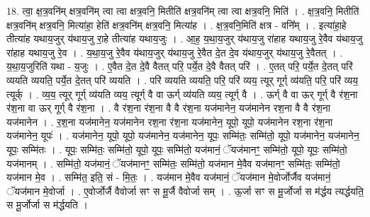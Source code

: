\documentclass[17pt]{extarticle}
\begin{document}
18. त्वा॒ क्ष॒त्र॒वनि॑म् क्षत्र॒वनि॑म् त्वा त्वा क्षत्र॒वनि॒ मितीति॑ क्षत्र॒वनि॑म् त्वा त्वा क्षत्र॒वनि॒ मिति॑ । . क्ष॒त्र॒वनि॒ मितीति॑ क्षत्र॒वनि॑म् क्षत्र॒वनि॒ मित्या॑हा॒ हेति॑ क्षत्र॒वनि॑म् क्षत्र॒वनि॒ मित्या॑ह । . क्ष॒त्र॒वनि॒मिति॑ क्षत्र - वनि᳚म् । . इत्या॑हा॒हे तीत्या॑ह यथाय॒जुर् य॑थाय॒जु रा॒हे तीत्या॑ह यथाय॒जुः । . आ॒ह॒ य॒था॒य॒जुर् य॑थाय॒जु रा॑हाह यथाय॒जु रे॒वैव य॑थाय॒जु रा॑हाह यथाय॒जु रे॒व । . य॒था॒य॒जु रे॒वैव य॑थाय॒जुर् य॑थाय॒जु रे॒वैत दे॒त दे॒व य॑थाय॒जुर् य॑थाय॒जु रे॒वैतत् । . य॒था॒य॒जुरिति॑ यथा - य॒जुः । . ए॒वैत दे॒त दे॒वै वैतत् परि॒ पर्ये॒त दे॒वै वैतत् परि॑ । . ए॒तत् परि॒ पर्ये॒त दे॒तत् परि॑ व्ययति व्ययति॒ पर्ये॒त दे॒तत् परि॑ व्ययति । . परि॑ व्ययति व्ययति॒ परि॒ परि॑ व्यय॒ त्यूर् गूर्ग् व्य॑यति॒ परि॒ परि॑ व्यय॒ त्यूर्क् । . व्य॒य॒ त्यूर् गूर्ग् व्य॑यति व्यय॒ त्यूर्ग् वै वा ऊर्ग् व्य॑यति व्यय॒ त्यूर्ग् वै । . ऊर्ग् वै वा ऊर् गूर्ग् वै र॑श॒ना र॑श॒ना वा ऊर् गूर्ग् वै र॑श॒ना । . वै र॑श॒ना र॑श॒ना वै वै र॑श॒ना यज॑मानेन॒ यज॑मानेन रश॒ना वै वै र॑श॒ना यज॑मानेन । . र॒श॒ना यज॑मानेन॒ यज॑मानेन रश॒ना र॑श॒ना यज॑मानेन॒ यूपो॒ यूपो॒ यज॑मानेन रश॒ना र॑श॒ना यज॑मानेन॒ यूपः॑ । . यज॑मानेन॒ यूपो॒ यूपो॒ यज॑मानेन॒ यज॑मानेन॒ यूपः॒ सम्मि॑तः॒ सम्मि॑तो॒ यूपो॒ यज॑मानेन॒ यज॑मानेन॒ यूपः॒ सम्मि॑तः । . यूपः॒ सम्मि॑तः॒ सम्मि॑तो॒ यूपो॒ यूपः॒ सम्मि॑तो॒ यज॑मानं॒ ॅयज॑मानꣳ॒॒ सम्मि॑तो॒ यूपो॒ यूपः॒ सम्मि॑तो॒ यज॑मानम् । . सम्मि॑तो॒ यज॑मानं॒ ॅयज॑मानꣳ॒॒ सम्मि॑तः॒ सम्मि॑तो॒ यज॑मान मे॒वैव यज॑मानꣳ॒॒ सम्मि॑तः॒ सम्मि॑तो॒ यज॑मान मे॒व । . सम्मि॑त॒ इति॒ सं - मि॒तः॒ । . यज॑मान मे॒वैव यज॑मानं॒ ॅयज॑मान मे॒वोर्जोर्जैव यज॑मानं॒ ॅयज॑मान मे॒वोर्जा । . ए॒वोर्जोर्जै वैवोर्जा सꣳ स मू॒र्जै वैवोर्जा सम् । . ऊ॒र्जा सꣳ स मू॒र्जोर्जा स म॑र्द्धय त्यर्द्धयति॒ स मू॒र्जोर्जा स म॑र्द्धयति । \newline
\end{document}
